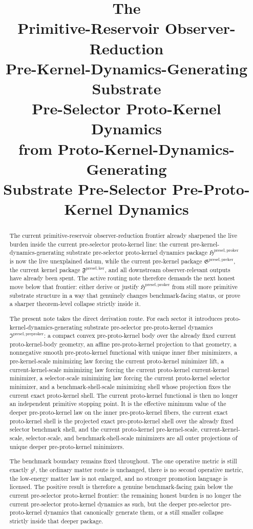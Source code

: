 \documentclass[11pt]{article}
\title{\textbf{The \TheoryName{}}\\[0.4em]
\large Primitive-Reservoir Observer-Reduction\\
\large Pre-Kernel-Dynamics-Generating Substrate\\
\large Pre-Selector Proto-Kernel Dynamics\\
\large from Proto-Kernel-Dynamics-Generating\\
\large Substrate Pre-Selector Pre-Proto-Kernel Dynamics}
\author{}
\date{}
\newcommand{\CompletedMetric}{g^{\sharp}}
\newcommand{\KernelPackage}{\mathfrak F^{\mathrm{presel,ker}}}
\newcommand{\PreKernelPackage}{\mathfrak G^{\mathrm{presel,preker}}}
\newcommand{\ProtoKernelPackage}{\mathfrak H^{\mathrm{presel,proker}}}
\newcommand{\PreProtoKernelPackage}{\mathfrak I^{\mathrm{presel,preproker}}}
\begin{document}
\maketitle

\begin{abstract}
The current primitive-reservoir observer-reduction frontier already sharpened the live burden inside the current pre-selector proto-kernel line: the current pre-kernel-dynamics-generating substrate pre-selector proto-kernel dynamics package \(\ProtoKernelPackage\) is now the live unexplained datum, while the current pre-kernel package \(\PreKernelPackage\), the current kernel package \(\KernelPackage\), and all downstream observer-relevant outputs have already been spent. The active routing note therefore demands the next honest move below that frontier: either derive or justify \(\ProtoKernelPackage\) from still more primitive substrate structure in a way that genuinely changes benchmark-facing status, or prove a sharper theorem-level collapse strictly inside it.

The present note takes the direct derivation route. For each sector it introduces proto-kernel-dynamics-generating substrate pre-selector pre-proto-kernel dynamics \(\PreProtoKernelPackage\): a compact convex pre-proto-kernel body over the already fixed current proto-kernel-body geometry, an affine pre-proto-kernel projection to that geometry, a nonnegative smooth pre-proto-kernel functional with unique inner fiber minimizers, a pre-kernel-scale minimizing law forcing the current proto-kernel minimizer lift, a current-kernel-scale minimizing law forcing the current proto-kernel current-kernel minimizer, a selector-scale minimizing law forcing the current proto-kernel selector minimizer, and a benchmark-shell-scale minimizing shell whose projection fixes the current exact proto-kernel shell. The current proto-kernel functional is then no longer an independent primitive stopping point. It is the effective minimum value of the deeper pre-proto-kernel law on the inner pre-proto-kernel fibers, the current exact proto-kernel shell is the projected exact pre-proto-kernel shell over the already fixed selector benchmark shell, and the current proto-kernel pre-kernel-scale, current-kernel-scale, selector-scale, and benchmark-shell-scale minimizers are all outer projections of unique deeper pre-proto-kernel minimizers.

The benchmark boundary remains fixed throughout. The one operative metric is still exactly \(\CompletedMetric\), the ordinary matter route is unchanged, there is no second operative metric, the low-energy matter law is not enlarged, and no stronger promotion language is licensed. The positive result is therefore a genuine benchmark-facing gain below the current pre-selector proto-kernel frontier: the remaining honest burden is no longer the current pre-selector proto-kernel dynamics as such, but the deeper pre-selector pre-proto-kernel dynamics that canonically generate them, or a still smaller collapse strictly inside that deeper package.
\end{abstract}
\end{document}
